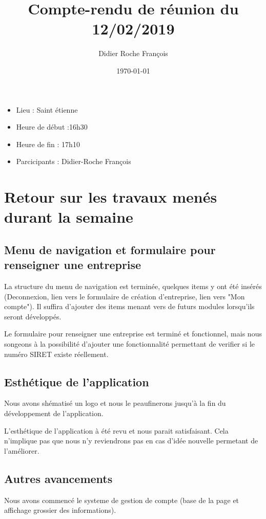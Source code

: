 \documentclass[a4paper]{article}
\title{Compte-rendu de réunion du 12/02/2019}
\author{Didier Roche François}
\date{\today}
\begin{document}
\renewcommand{\contentsname}{Ordre du jour}
\maketitle
\thispagestyle{fancy}


\begin{itemize}
\item Lieu : Saint étienne
\item Heure de début :16h30
\item Heure de fin : 17h10
\item Parcicipants : Didier-Roche François
\end{itemize}

\bigbreak
\bigbreak
\bigbreak

\tableofcontents


\newpage

\section{Retour sur les travaux menés durant la semaine}
\subsection{Menu de navigation et formulaire pour renseigner une entreprise}
La structure du menu de navigation est terminée, quelques items y ont été insérés
(Deconnexion, lien vers le formulaire de création d'entreprise, lien vers "Mon compte"). Il suffira d'ajouter des items menant vers de futurs modules lorsqu'ils seront développés.

Le formulaire pour renseigner une entreprise est terminé et fonctionnel, mais nous songeons à la possibilité d'ajouter une fonctionnalité permettant de verifier si le numéro SIRET existe réellement.
\subsection{Esthétique de l'application}
Nous avons shématisé un logo et nous le peaufinerons jusqu'à la fin du développement de l'application.

L'esthétique de l'application à été revu et nous parait satisfaisant. Cela n'implique pas que nous n'y reviendrons pas en cas d'idée nouvelle permetant de l'améliorer.


\subsection{Autres avancements}
Nous avons commencé le systeme de gestion de compte (base de la page et affichage grossier des informations).
\end{document}
